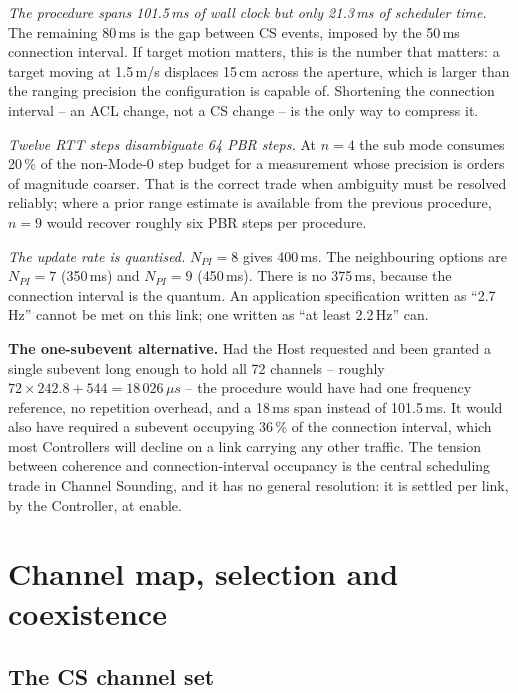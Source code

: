 \documentclass[11pt,a4paper]{article}
\newcommand{\us}{\,\ensuremath{\upmu}s}
\newcommand{\Npi}{N_{PI}}
\providecommand{\upmu}{\mu}
\begin{document}
\emph{The procedure spans 101.5\,ms of wall clock but only 21.3\,ms of scheduler time.} The remaining
80\,ms is the gap between CS events, imposed by the 50\,ms connection interval. If target motion
matters, this is the number that matters: a target moving at 1.5\,m/s displaces 15\,cm across the
aperture, which is larger than the ranging precision the configuration is capable of. Shortening the
connection interval -- an ACL change, not a CS change -- is the only way to compress it.

\emph{Twelve RTT steps disambiguate 64 PBR steps.} At $n = 4$ the sub mode consumes 20\,\% of the
non-Mode-0 step budget for a measurement whose precision is orders of magnitude coarser. That is the
correct trade when ambiguity must be resolved reliably; where a prior range estimate is available
from the previous procedure, $n = 9$ would recover roughly six PBR steps per procedure.

\emph{The update rate is quantised.} $\Npi = 8$ gives 400\,ms. The neighbouring options are
$\Npi = 7$ (350\,ms) and $\Npi = 9$ (450\,ms). There is no 375\,ms, because the connection interval is
the quantum. An application specification written as ``2.7\,Hz'' cannot be met on this link; one
written as ``at least 2.2\,Hz'' can.

\begin{callout}
\textbf{The one-subevent alternative.} Had the Host requested and been granted a single subevent long
enough to hold all 72 channels -- roughly $72 \times 242.8 + 544 = 18\,026\us$ -- the procedure would
have had one frequency reference, no repetition overhead, and a 18\,ms span instead of 101.5\,ms. It
would also have required a subevent occupying 36\,\% of the connection interval, which most
Controllers will decline on a link carrying any other traffic. The tension between coherence and
connection-interval occupancy is the central scheduling trade in Channel Sounding, and it has no
general resolution: it is settled per link, by the Controller, at enable.
\end{callout}

\section{Channel map, selection and coexistence}
\label{sec:channels}

\subsection{The CS channel set}
\end{document}
